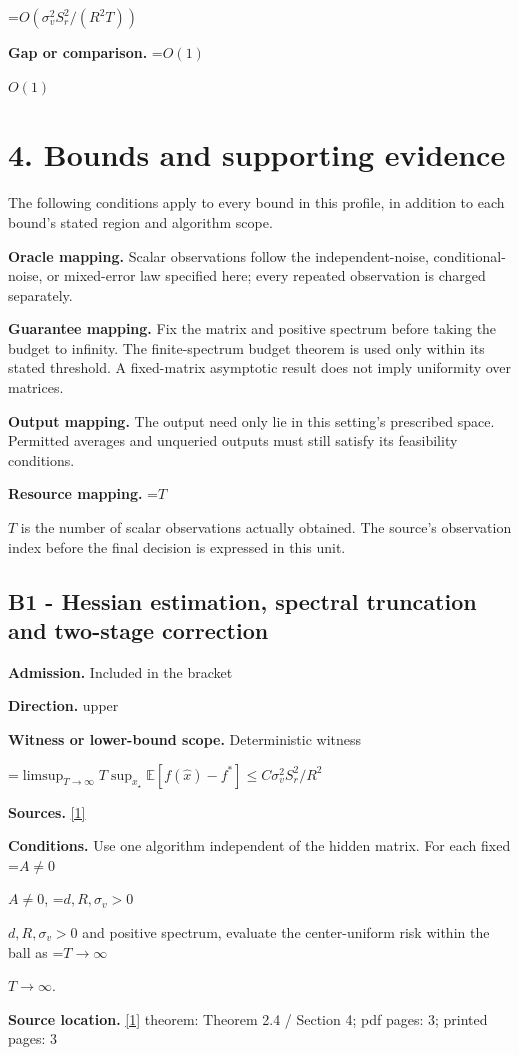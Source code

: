 \documentclass[10pt,a4paper]{article}
\newcommand{\AtlasMath}[1]{\par\begingroup\centering\setbox0=\hbox{$\displaystyle #1$}\ifdim\wd0>1.4\linewidth\typeout{ATLAS WIDE FORMULA: \the\wd0}\fi\ifdim\wd0>\linewidth\resizebox{\linewidth}{!}{\box0}\else\box0\fi\par\endgroup}
\newcommand{\AtlasInlineMath}[1]{\begingroup\setbox0=\hbox{$#1$}\ifdim\wd0>.4\linewidth\endgroup\AtlasMath{#1}\else\endgroup$#1$\fi}
\begin{document}
\AtlasMath{O(\sigma_v^2S_r^2/(R^2T))}
\textbf{Gap or comparison.} \AtlasInlineMath{O(1)}

\section{4. Bounds and supporting evidence}
The following conditions apply to every bound in this profile, in addition to each bound's stated region and algorithm scope.

\textbf{Oracle mapping.} Scalar observations follow the independent-noise, conditional-noise, or mixed-error law specified here; every repeated observation is charged separately.

\textbf{Guarantee mapping.} Fix the matrix and positive spectrum before taking the budget to infinity. The finite-spectrum budget theorem is used only within its stated threshold. A fixed-matrix asymptotic result does not imply uniformity over matrices.

\textbf{Output mapping.} The output need only lie in this setting's prescribed space. Permitted averages and unqueried outputs must still satisfy its feasibility conditions.

\textbf{Resource mapping.} \AtlasInlineMath{T} is the number of scalar observations actually obtained. The source's observation index before the final decision is expressed in this unit.

\subsection{B1 - Hessian estimation, spectral truncation and two-stage correction}
\textbf{Admission.} Included in the bracket

\textbf{Direction.} upper

\textbf{Witness or lower-bound scope.} Deterministic witness

\AtlasMath{\limsup_{T\to\infty}T\sup_{x_\star}\mathbb{E}[f(\hat{x})-f^*]\le C\sigma_v^2S_r^2/R^2}
\textbf{Sources.} \href{https://proceedings.neurips.cc/paper_files/paper/2023/file/6e60a9023d2c63f7f0856910129ae753-Paper-Conference.pdf}{[1]}

\textbf{Conditions.} Use one algorithm independent of the hidden matrix. For each fixed \AtlasInlineMath{A\ne0}, \AtlasInlineMath{d,R,\sigma_v>0} and positive spectrum, evaluate the center-uniform risk within the ball as \AtlasInlineMath{T\to\infty}.

\textbf{Source location.} \href{https://proceedings.neurips.cc/paper_files/paper/2023/file/6e60a9023d2c63f7f0856910129ae753-Paper-Conference.pdf}{[1]} theorem: Theorem 2.4 / Section 4; pdf pages: 3; printed pages: 3
\end{document}
